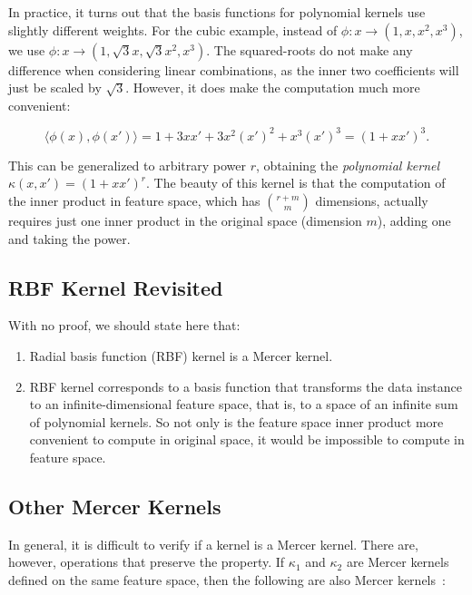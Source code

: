 \begin{refsection}
In practice, it turns out that the basis functions for polynomial kernels use slightly different weights. For the cubic example, instead of $\phi: x \rightarrow (1, x, x^2, x^3)$, we use $\phi: x \rightarrow (1, \sqrt{3}x, \sqrt{3}x^2, x^3)$. The squared-roots do not make any difference when considering linear combinations, as the inner two coefficients will just be scaled by $\sqrt{3}$. However, it does make the computation much more convenient:

$$\langle\phi(x), \phi(x')\rangle = 1 + 3xx' + 3x^2(x')^2 + x^3(x')^3 = (1 + xx')^3.$$

This can be generalized to arbitrary power $r$, obtaining the {\em polynomial kernel} $\kappa(x,x') = (1 + xx')^r$. The beauty of this kernel is that the computation of the inner product in feature space, which has ${r+m}\choose{m}$ dimensions, actually requires just one inner product in the original space (dimension $m$), adding one and taking the power.

\subsection*{RBF Kernel Revisited}

With no proof, we should state here that:
\begin{enumerate}
\item Radial basis function (RBF) kernel is a Mercer kernel.
\item RBF kernel corresponds to a basis function that transforms the data instance to an infinite-dimensional feature space, that is, to a space of an infinite sum of polynomial kernels. So not only is the feature space inner product more convenient to compute in original space, it would be impossible to compute in feature space.
\end{enumerate}



\subsection*{Other Mercer Kernels}

In general, it is difficult to verify if a kernel is a Mercer kernel. There are, however, operations that preserve the property. If $\kappa_1$ and $\kappa_2$ are Mercer kernels defined on the same feature space, then the following are also Mercer kernels~\citep{ShaweTaylorCristianini2004}:


\end{refsection}
